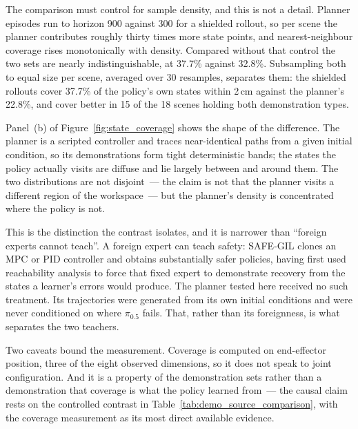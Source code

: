 \documentclass[a4paper,11pt]{report}
\begin{document}
The comparison must control for sample density, and this is not a detail. Planner episodes run to
horizon 900 against 300 for a shielded rollout, so per scene the planner contributes roughly thirty
times more state points, and nearest-neighbour coverage rises monotonically with density. Compared
without that control the two sets are nearly indistinguishable, at 37.7\% against 32.8\%.
Subsampling both to equal size per scene, averaged over 30 resamples, separates them: the shielded
rollouts cover 37.7\% of the policy's own states within 2\,cm against the planner's 22.8\%, and
cover better in 15 of the 18 scenes holding both demonstration types.

Panel~(b) of Figure~\ref{fig:state_coverage} shows the shape of the difference. The planner is a
scripted controller and traces near-identical paths from a given initial condition, so its
demonstrations form tight deterministic bands; the states the policy actually visits are diffuse
and lie largely between and around them. The two distributions are not disjoint~--- the claim is
not that the planner visits a different region of the workspace~--- but the planner's density is
concentrated where the policy is not.

This is the distinction the contrast isolates, and it is narrower than ``foreign experts cannot
teach''. A foreign expert can teach safety: SAFE-GIL clones an MPC or PID controller and obtains
substantially safer policies, having first used reachability analysis to force that fixed expert to
demonstrate recovery from the states a learner's errors would produce. The planner tested here
received no such treatment. Its trajectories were generated from its own initial conditions and
were never conditioned on where $\pi_{0.5}$ fails. That, rather than its foreignness, is what
separates the two teachers.

Two caveats bound the measurement. Coverage is computed on end-effector position, three of the
eight observed dimensions, so it does not speak to joint configuration. And it is a property of the
demonstration sets rather than a demonstration that coverage is what the policy learned from~---
the causal claim rests on the controlled contrast in Table~\ref{tab:demo_source_comparison}, with
the coverage measurement as its most direct available evidence.
\end{document}
